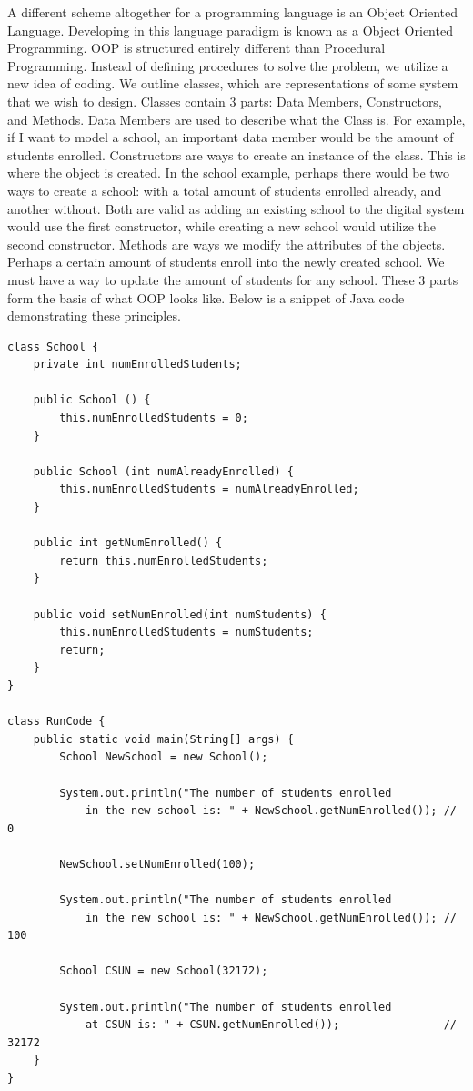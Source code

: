 A different scheme altogether for a programming language is an Object Oriented Language.
Developing in this language paradigm is known as a Object Oriented Programming.
OOP is structured entirely different than Procedural Programming.
Instead of defining procedures to solve the problem, we utilize a new idea of coding.
We outline classes, which are representations of some system that we wish to design.
Classes contain 3 parts: Data Members, Constructors, and Methods.
Data Members are used to describe what the Class is.
For example, if I want to model a school, an important data member would be the amount of students enrolled.
Constructors are ways to create an instance of the class.
This is where the object is created.
In the school example, perhaps there would be two ways to create a school: with a total amount of students enrolled already, and another without.
Both are valid as adding an existing school to the digital system would use the first constructor, while creating a new school would utilize the second constructor.
Methods are ways we modify the attributes of the objects.
Perhaps a certain amount of students enroll into the newly created school.
We must have a way to update the amount of students for any school.
These 3 parts form the basis of what OOP looks like.
Below is a snippet of Java code demonstrating these principles.

\begin{verbatim}
class School {
    private int numEnrolledStudents;
    
    public School () {
        this.numEnrolledStudents = 0;
    }
    
    public School (int numAlreadyEnrolled) {
        this.numEnrolledStudents = numAlreadyEnrolled;
    }
    
    public int getNumEnrolled() {
        return this.numEnrolledStudents;
    }
    
    public void setNumEnrolled(int numStudents) {
        this.numEnrolledStudents = numStudents;
        return;
    }
}

class RunCode {
    public static void main(String[] args) {
        School NewSchool = new School();
        
        System.out.println("The number of students enrolled 
            in the new school is: " + NewSchool.getNumEnrolled()); // 0
        
        NewSchool.setNumEnrolled(100);
        
        System.out.println("The number of students enrolled
            in the new school is: " + NewSchool.getNumEnrolled()); // 100
        
        School CSUN = new School(32172);
        
        System.out.println("The number of students enrolled
            at CSUN is: " + CSUN.getNumEnrolled());                // 32172
    }
}
\end{verbatim}


